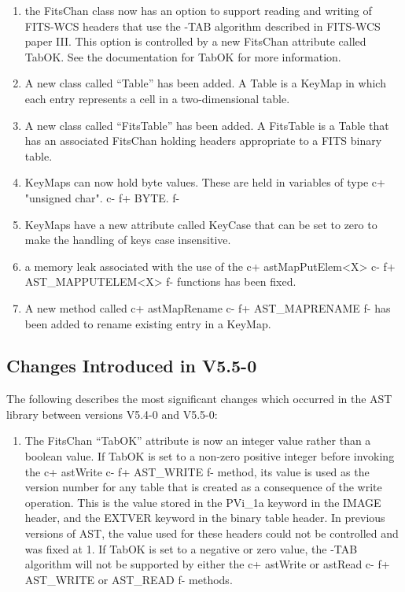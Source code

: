 \documentclass[twoside,11pt]{starlink}
\begin{document}
\begin{enumerate}

\item the FitsChan class now has an option to support reading and writing
of FITS-WCS headers that use the -TAB algorithm described in FITS-WCS paper
III. This option is controlled by a new FitsChan attribute called TabOK.
See the documentation for TabOK for more information.

\item A new class called ``Table'' has been added. A Table is a KeyMap in
which each entry represents a cell in a two-dimensional table.

\item A new class called ``FitsTable'' has been added. A FitsTable is a
Table that has an associated FitsChan holding headers appropriate to a
FITS binary table.

\item KeyMaps can now hold byte values. These are held in variables
of type
c+
"unsigned char".
c-
f+
BYTE.
f-

\item KeyMaps have a new attribute called KeyCase that can be set to zero to
make the handling of keys case insensitive.

\item a memory leak associated with the use of the
c+
astMapPutElem<X>
c-
f+
AST\_MAPPUTELEM<X>
f-
functions has been fixed.

\item A new method called
c+
astMapRename
c-
f+
AST\_MAPRENAME
f-
has been added to rename existing entry in a KeyMap.
\end{enumerate}

\subsection{Changes Introduced in V5.5-0}

The following describes the most significant changes which
occurred in the AST library between versions V5.4-0 and V5.5-0:

\begin{enumerate}

\item The FitsChan ``TabOK'' attribute is now an integer value rather
than a boolean value. If TabOK is set to a non-zero positive integer
before invoking the
c+
astWrite
c-
f+
AST\_WRITE
f-
method, its value is used as the version number for any table that is
created as a consequence of the write operation. This is the value stored
in the PVi\_1a keyword in the IMAGE header, and the EXTVER keyword in the
binary table header. In previous versions of AST, the value used for these
headers could not be controlled and was fixed at 1. If TabOK is set to a
negative or zero value, the -TAB algorithm will not be supported by
either the
c+
astWrite or astRead
c-
f+
AST\_WRITE or AST\_READ
f-
methods.

\end{enumerate}
\end{document}
